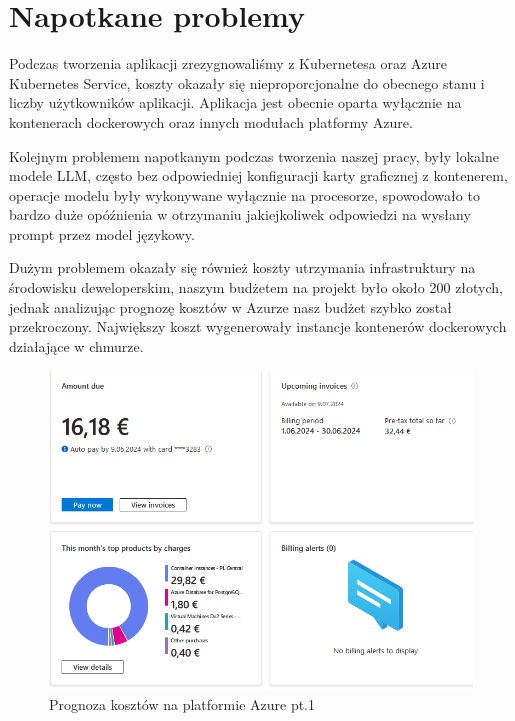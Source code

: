\section{Napotkane problemy}
Podczas tworzenia aplikacji zrezygnowaliśmy z Kubernetesa oraz Azure Kubernetes Service, koszty okazały się nieproporcjonalne do obecnego stanu i liczby użytkowników aplikacji. Aplikacja jest obecnie oparta wyłącznie na kontenerach dockerowych oraz innych modułach platformy Azure.

Kolejnym problemem napotkanym podczas tworzenia naszej pracy, były lokalne modele LLM, często bez odpowiedniej konfiguracji karty graficznej z kontenerem, operacje modelu były wykonywane wyłącznie na procesorze, spowodowało to bardzo duże opóźnienia w otrzymaniu jakiejkoliwek odpowiedzi na wysłany prompt przez model językowy.

Dużym problemem okazały się również koszty utrzymania infrastruktury na środowisku deweloperskim, naszym budżetem na projekt było około 200 złotych, jednak analizując prognozę kosztów w Azurze nasz budżet szybko został przekroczony. Największy koszt wygenerowały instancje kontenerów dockerowych działające w chmurze. 

\begin{figure}[h]
    \centering
    \includegraphics[width=1\textwidth]{Obrazy/costs/costs_1.png}
    \caption{Prognoza kosztów na platformie Azure pt.1}
    \label{fig:my_label}
\end{figure}

